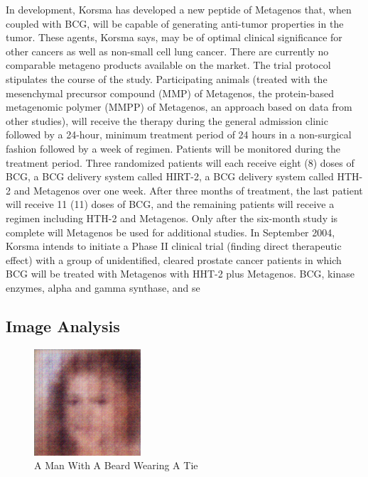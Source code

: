 \documentclass{article}%
\begin{document}
In development, Korsma has developed a new peptide of Metagenos that, when coupled with BCG, will be capable of generating anti{-}tumor properties in the tumor. These agents, Korsma says, may be of optimal clinical significance for other cancers as well as non{-}small cell lung cancer.\newline%
There are currently no comparable metageno products available on the market.\newline%
The trial protocol stipulates the course of the study. Participating animals (treated with the mesenchymal precursor compound (MMP) of Metagenos, the protein{-}based metagenomic polymer (MMPP) of Metagenos, an approach based on data from other studies), will receive the therapy during the general admission clinic followed by a 24{-}hour, minimum treatment period of 24 hours in a non{-}surgical fashion followed by a week of regimen. Patients will be monitored during the treatment period. Three randomized patients will each receive eight (8) doses of BCG, a BCG delivery system called HIRT{-}2, a BCG delivery system called HTH{-}2 and Metagenos over one week. After three months of treatment, the last patient will receive 11 (11) doses of BCG, and the remaining patients will receive a regimen including HTH{-}2 and Metagenos. Only after the six{-}month study is complete will Metagenos be used for additional studies. In September 2004, Korsma intends to initiate a Phase II clinical trial (finding direct therapeutic effect) with a group of unidentified, cleared prostate cancer patients in which BCG will be treated with Metagenos with HHT{-}2 plus Metagenos.\newline%
BCG, kinase enzymes, alpha and gamma synthase, and se

%
\subsection{Image Analysis}%
\label{subsec:ImageAnalysis}%


\begin{figure}[h!]%
\centering%
\includegraphics[width=150px]{500_fake_images/samples_5_208.png}%
\caption{A Man With A Beard Wearing A Tie}%
\end{figure}

%
\end{document}
